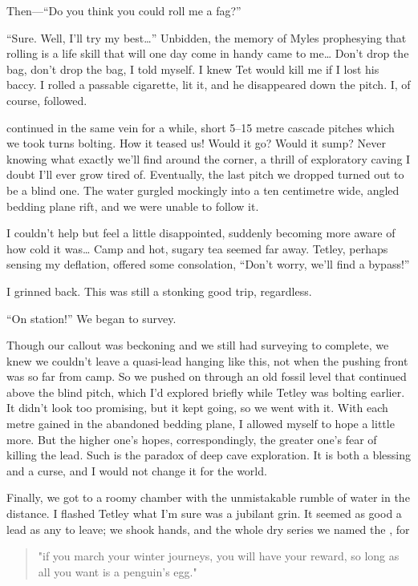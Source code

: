Then---``Do you think you could roll me a fag?''

``Sure. Well, I'll try my best\ldots{}'' Unbidden, the memory of Myles
prophesying that rolling is a life skill that will one day come in handy
came to me\ldots{} Don't drop the bag, don't drop the bag, I told
myself. I knew Tet would kill me if I lost his baccy. I rolled a
passable cigarette, lit it, and he disappeared down the pitch. I, of
course, followed.

 continued in the same vein for a while, short 5--15
metre cascade pitches which we took turns bolting. How it teased us!
Would it go? Would it sump? Never knowing what exactly we'll find around
the corner, a thrill of exploratory caving I doubt I'll ever grow tired
of. Eventually, the last pitch we dropped turned out to be a blind one.
The water gurgled mockingly into a ten centimetre wide, angled bedding
plane rift, and we were unable to follow it.

I couldn't help but feel a little disappointed, suddenly becoming more
aware of how cold it was\ldots{} Camp  and hot, sugary tea
seemed far away. Tetley, perhaps sensing my deflation, offered some
consolation, ``Don't worry, we'll find a bypass!''

I grinned back. This was still a stonking good trip, regardless.

``On station!'' We began to survey.

Though our callout was beckoning and we still had surveying to complete,
we knew we couldn't leave a quasi-lead hanging like this, not when the
pushing front was so far from camp. So we pushed on through an old
fossil level that continued above the blind pitch, which I'd explored
briefly while Tetley was bolting earlier. It didn't look too promising,
but it kept going, so we went with it. With each metre gained in the
abandoned bedding plane, I allowed myself to hope a little more. But the
higher one's hopes, correspondingly, the greater one's fear of killing
the lead. Such is the paradox of deep cave exploration. It is both a
blessing and a curse, and I would not change it for the world.

Finally, we got to a roomy chamber with the unmistakable rumble of water
in the distance. I flashed Tetley what I'm sure was a jubilant grin. It
seemed as good a lead as any to leave; we shook hands, and the whole dry
series we named the , for

\begin{quote}"if you march your winter journeys, you will have your reward, so long as all you want is a penguin’s egg." \end{quote}

